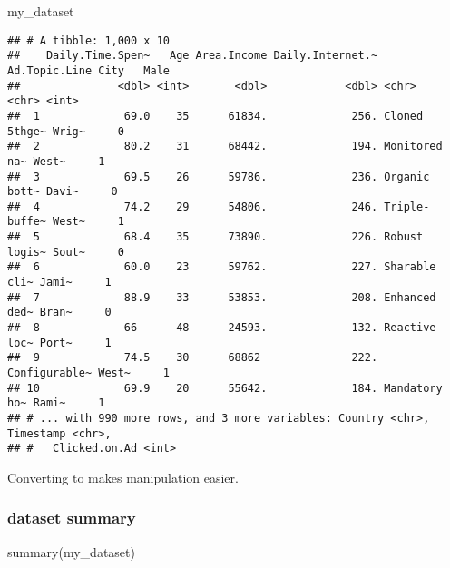 \documentclass[
]{article}
\newenvironment{Shaded}{\begin{snugshade}}{\end{snugshade}}
\newcommand{\FunctionTok}[1]{\textcolor[rgb]{0.00,0.00,0.00}{#1}}
\newcommand{\NormalTok}[1]{#1}
\begin{document}
\begin{Shaded}
\begin{Highlighting}[]
\NormalTok{my\_dataset}
\end{Highlighting}
\end{Shaded}

\begin{verbatim}
## # A tibble: 1,000 x 10
##    Daily.Time.Spen~   Age Area.Income Daily.Internet.~ Ad.Topic.Line City   Male
##               <dbl> <int>       <dbl>            <dbl> <chr>         <chr> <int>
##  1             69.0    35      61834.             256. Cloned 5thge~ Wrig~     0
##  2             80.2    31      68442.             194. Monitored na~ West~     1
##  3             69.5    26      59786.             236. Organic bott~ Davi~     0
##  4             74.2    29      54806.             246. Triple-buffe~ West~     1
##  5             68.4    35      73890.             226. Robust logis~ Sout~     0
##  6             60.0    23      59762.             227. Sharable cli~ Jami~     1
##  7             88.9    33      53853.             208. Enhanced ded~ Bran~     0
##  8             66      48      24593.             132. Reactive loc~ Port~     1
##  9             74.5    30      68862              222. Configurable~ West~     1
## 10             69.9    20      55642.             184. Mandatory ho~ Rami~     1
## # ... with 990 more rows, and 3 more variables: Country <chr>, Timestamp <chr>,
## #   Clicked.on.Ad <int>
\end{verbatim}

Converting to makes manipulation easier.

\hypertarget{dataset-summary}{%
\subsubsection{dataset summary}\label{dataset-summary}}

\begin{Shaded}
\begin{Highlighting}[]
\FunctionTok{summary}\NormalTok{(my\_dataset)}
\end{Highlighting}
\end{Shaded}
\end{document}

